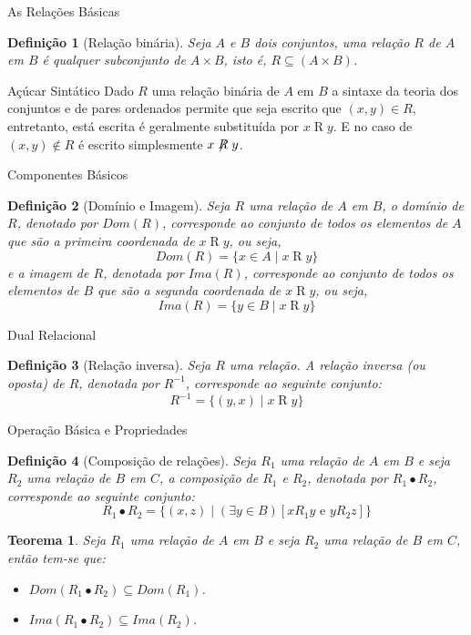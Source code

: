 \documentclass[aspectratio=169]{beamer}
\newtheorem{defi}{Definição}
\newtheorem{teo}{Teorema}
\begin{document}
	\begin{frame}{As Relações Básicas}
		\begin{defi}[Relação binária]\label{def:RelacaoBinaria}
			Seja $A$ e $B$ dois conjuntos, uma relação $R$ de $A$ em $B$ é qualquer subconjunto de $A \times B$, isto é, $R \subseteq (A \times B)$.
		\end{defi}
		\pause
		\begin{alertblock}{Açúcar Sintático}
			Dado $R$ uma relação binária de $A$ em $B$ a sintaxe da teoria dos conjuntos e de pares ordenados permite que seja escrito que $(x, y) \in R$, entretanto, está escrita é geralmente substituída por $x\mathrel{R}y$. E no caso de $(x,y) \notin R$ é escrito simplesmente $x\centernot{R}y$.
		\end{alertblock}
	\end{frame}

	\begin{frame}{Componentes Básicos}
		\begin{defi}[Domínio e Imagem]\label{def:DominioImagemRelacoes}
			Seja $R$ uma relação de $A$ em $B$, o domínio de $R$, denotado por $Dom(R)$, corresponde ao conjunto de todos os elementos de $A$ que são a primeira coordenada de $x\mathrel{R}y$, ou seja, 
			$$Dom(R) = \{x \in A \mid x\mathrel{R}y\}$$
			e a imagem de $R$, denotada por $Ima(R)$, corresponde ao conjunto de todos os elementos de $B$ que são a segunda coordenada de $x\mathrel{R}y$, ou seja, 
			$$Ima(R) = \{y \in B \mid x\mathrel{R}y\}$$
		\end{defi}
	\end{frame}

	\begin{frame}{Dual Relacional}
		\begin{defi}[Relação inversa]\label{def:RelacaoInversa}
			Seja $R$ uma relação. A relação inversa (ou oposta) de $R$, denotada por $R^{-1}$, corresponde ao seguinte conjunto:
			$$R^{-1} = \{(y,x) \mid x\mathrel{R}y\}$$
		\end{defi}
	\end{frame}

	\begin{frame}{Operação Básica e Propriedades}
		\begin{defi}[Composição de relações]\label{def:ComposicaoRelacoes}
			Seja $R_1$ uma relação de $A$ em $B$ e seja $R_2$ uma relação de $B$ em $C$, a composição de $R_1$ e $R_2$, denotada por $R_1 \bullet R_2$, corresponde ao seguinte conjunto:
			$$R_1 \bullet R_2 = \{(x, z) \mid (\exists y \in B)[x\mathrel{R_1}y \text{ e } y\mathrel{R_2}z] \}$$ 
		\end{defi}
		\pause
		\begin{teo}
			Seja $R_1$ uma relação de $A$ em $B$ e seja $R_2$ uma relação de $B$ em $C$, então tem-se que:
			\begin{itemize}
				\item[(i)] $Dom(R_1 \bullet R_2) \subseteq Dom(R_1)$.
				\item[(ii)] $Ima(R_1 \bullet R_2) \subseteq Ima(R_2)$.
			\end{itemize}
		\end{teo}
	\end{frame}
	
\end{document}
